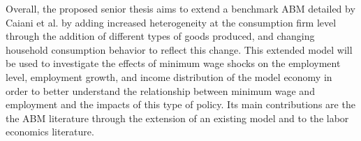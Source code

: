 \documentclass[11pt]{article}
\begin{document}


Overall, the proposed senior thesis aims to extend a benchmark ABM detailed
by Caiani et al. by adding increased heterogeneity at the consumption firm level
through the addition of different types of goods produced, and changing household
consumption behavior to reflect this change. This extended model will be used to
investigate the effects of minimum wage shocks on the employment level, employment
 growth, and income distribution of the model economy in order to better understand
 the relationship between minimum wage and employment and the impacts of this type
 of policy. Its main contributions are the the ABM literature through the extension
 of an existing model and to the labor economics literature.



\end{document}
